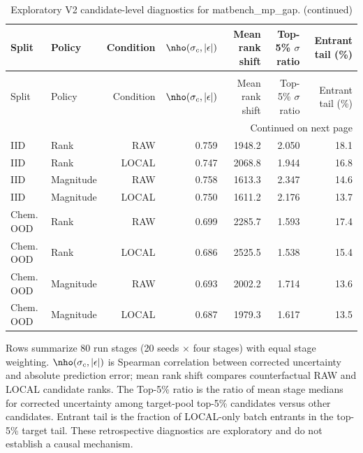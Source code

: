 \setlength{\tabcolsep}{3.5pt}
\scriptsize
\begin{longtable}{@{}llrrrrr@{}}
\caption{Exploratory V2 candidate-level diagnostics for matbench\_mp\_gap.}\label{tab:v2_mp_gap_diagnostics}\\
\toprule
Split & Policy & Condition & $\nho(\sigma_c,|\epsilon|)$ & Mean rank shift & Top-5\% $\sigma$ ratio & Entrant tail (\%) \\
\midrule
\endfirsthead
\caption[]{Exploratory V2 candidate-level diagnostics for matbench\_mp\_gap. (continued)}\\
\toprule
Split & Policy & Condition & $\nho(\sigma_c,|\epsilon|)$ & Mean rank shift & Top-5\% $\sigma$ ratio & Entrant tail (\%) \\
\midrule
\endhead
\midrule\multicolumn{7}{r}{Continued on next page}\\
\endfoot
\bottomrule
\endlastfoot
IID & Rank & RAW & 0.759 & 1948.2 & 2.050 & 18.1 \\
IID & Rank & LOCAL & 0.747 & 2068.8 & 1.944 & 16.8 \\
IID & Magnitude & RAW & 0.758 & 1613.3 & 2.347 & 14.6 \\
IID & Magnitude & LOCAL & 0.750 & 1611.2 & 2.176 & 13.7 \\
Chem. OOD & Rank & RAW & 0.699 & 2285.7 & 1.593 & 17.4 \\
Chem. OOD & Rank & LOCAL & 0.686 & 2525.5 & 1.538 & 15.4 \\
Chem. OOD & Magnitude & RAW & 0.693 & 2002.2 & 1.714 & 13.6 \\
Chem. OOD & Magnitude & LOCAL & 0.687 & 1979.3 & 1.617 & 13.5 \\
\end{longtable}
\noindent\footnotesize Rows summarize 80 run stages (20 seeds $\times$ four stages) with equal stage weighting. $\nho(\sigma_c,|\epsilon|)$ is Spearman correlation between corrected uncertainty and absolute prediction error; mean rank shift compares counterfactual RAW and LOCAL candidate ranks. The Top-5\% ratio is the ratio of mean stage medians for corrected uncertainty among target-pool top-5\% candidates versus other candidates. Entrant tail is the fraction of LOCAL-only batch entrants in the top-5\% target tail. These retrospective diagnostics are exploratory and do not establish a causal mechanism.
